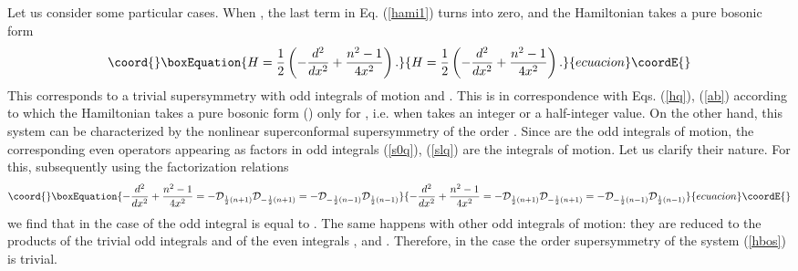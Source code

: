 \documentclass[a4paper,12pt]{article}
\begin{document}
Let us consider some particular cases.
When \coordHE{}, the last term in Eq. (\ref{hami1})
turns into zero, and the Hamiltonian takes a pure bosonic
form
\begin{equation}\coord{}\boxEquation{
H=\frac{1}{2}\left(-\frac{d^2}{dx^2}+\frac{n^2-1}{4x^2}
\right).
\label{hbos}
}{
H=\frac{1}{2}\left(-\frac{d^2}{dx^2}+\frac{n^2-1}{4x^2}
\right).
}{ecuacion}\coordE{}\end{equation}
This corresponds to a trivial supersymmetry
with odd integrals of motion \myHighlight{$\psi^+$}\coordHE{} and \myHighlight{$\psi^-$}\coordHE{}.
This is in correspondence with Eqs. (\ref{hq}),
(\ref{ab}) according to which
the Hamiltonian
takes a pure bosonic form (\coordHE{})
only for \coordHE{},
i.e. when \myHighlight{$\alpha$}\coordHE{} takes an integer or a half-integer value.
On the other hand, this system can be characterized
by the nonlinear superconformal supersymmetry of
the order \coordHE{}.
Since \myHighlight{$\psi^\pm$}\coordHE{} are the odd integrals of motion,
the corresponding even operators
appearing as factors in odd integrals
(\ref{s0q}), (\ref{slq})
are the integrals of motion.
Let us clarify their nature.
For this,
subsequently using the factorization relations
\begin{equation}\coord{}\boxEquation{
-\frac{d^2}{dx^2}+\frac{n^2-1}{4x^2}=-
{\cal D}_{\frac{1}{2}(n+1)}
{\cal D}_{-\frac{1}{2}(n+1)}=
-{\cal D}_{-\frac{1}{2}(n-1)}
{\cal D}_{\frac{1}{2}(n-1)}
\label{factor}
}{
-\frac{d^2}{dx^2}+\frac{n^2-1}{4x^2}=-
{\cal D}_{\frac{1}{2}(n+1)}
{\cal D}_{-\frac{1}{2}(n+1)}=
-{\cal D}_{-\frac{1}{2}(n-1)}
{\cal D}_{\frac{1}{2}(n-1)}
}{ecuacion}\coordE{}\end{equation}
we find that in the case of \coordHE{}
the odd integral \coordHE{} is
equal to \coordHE{}.
The same happens with
other odd integrals of motion:
they are reduced to the products of
the trivial
odd integrals \myHighlight{$\psi^\pm$}\coordHE{} and of the
even integrals \coordHE{}, \coordHE{} and \coordHE{}.
Therefore, in the case \coordHE{} the order \coordHE{} supersymmetry
of the system (\ref{hbos}) is trivial.
\end{document}
